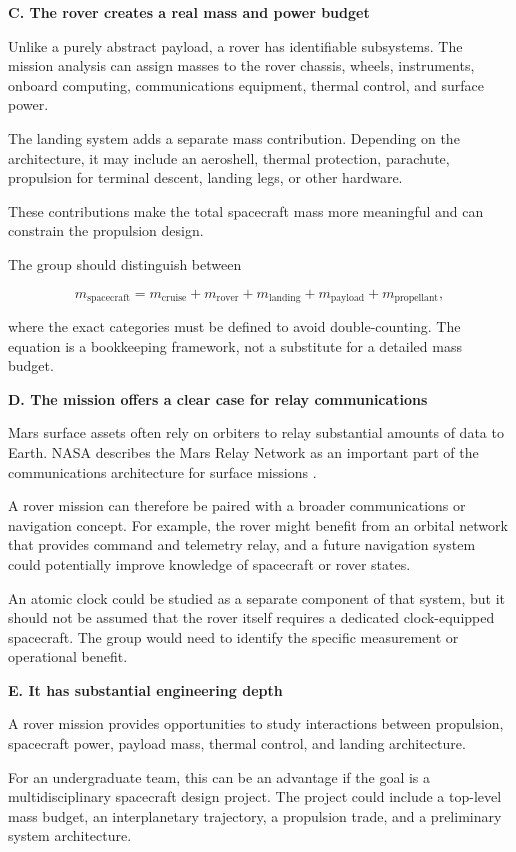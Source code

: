 \textbf{C. The rover creates a real mass and power budget}

Unlike a purely abstract payload, a rover has identifiable
subsystems. The mission analysis can assign masses to the
rover chassis, wheels, instruments, onboard computing,
communications equipment, thermal control, and surface power.

The landing system adds a separate mass contribution. Depending
on the architecture, it may include an aeroshell, thermal
protection, parachute, propulsion for terminal descent, landing
legs, or other hardware.

These contributions make the total spacecraft mass more
meaningful and can constrain the propulsion design.

The group should distinguish between

\[
	m_{\mathrm{spacecraft}}
	=
	m_{\mathrm{cruise}}
	+
	m_{\mathrm{rover}}
	+
	m_{\mathrm{landing}}
	+
	m_{\mathrm{payload}}
	+
	m_{\mathrm{propellant}},
\]

where the exact categories must be defined to avoid double-counting.
The equation is a bookkeeping framework, not a substitute for
a detailed mass budget.

\textbf{D. The mission offers a clear case for relay communications}

Mars surface assets often rely on orbiters to relay substantial
amounts of data to Earth. NASA describes the Mars Relay Network
as an important part of the communications architecture for
surface missions \cite{MarsRelayNetwork}.

A rover mission can therefore be paired with a broader
communications or navigation concept. For example, the rover
might benefit from an orbital network that provides command
and telemetry relay, and a future navigation system could
potentially improve knowledge of spacecraft or rover states.

An atomic clock could be studied as a separate component of
that system, but it should not be assumed that the rover itself
requires a dedicated clock-equipped spacecraft. The group
would need to identify the specific measurement or operational
benefit.

\textbf{E. It has substantial engineering depth}

A rover mission provides opportunities to study interactions
between propulsion, spacecraft power, payload mass, thermal
control, and landing architecture.

For an undergraduate team, this can be an advantage if the
goal is a multidisciplinary spacecraft design project. The
project could include a top-level mass budget, an interplanetary
trajectory, a propulsion trade, and a preliminary system
architecture.

